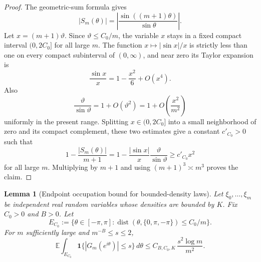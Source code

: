 \documentclass[11pt]{amsart}
\numberwithin{equation}{section}
\newtheorem{lemma}[theorem]{Lemma}
\theoremstyle{definition}
\theoremstyle{remark}
\newcommand{\Exp}{\mathbb E}
\newcommand{\abs}[1]{\left\lvert #1\right\rvert}
\begin{document}
\begin{proof}
The geometric-sum formula gives
\[
  |S_m(\theta)|
  =\left|\frac{\sin((m+1)\theta)}{\sin\theta}\right|.
\]
Let \(x=(m+1)\vartheta\).  Since \(\vartheta\le C_0/m\), the variable \(x\)
stays in a fixed compact interval \((0,2C_0]\) for all large \(m\).  The
function \(x\mapsto |\sin x|/x\) is strictly less than one on every compact
subinterval of \((0,\infty)\), and near zero its Taylor expansion is
\[
  \frac{\sin x}{x}=1-\frac{x^2}{6}+O(x^4).
\]
Also
\[
  \frac{\vartheta}{\sin\vartheta}=1+O(\vartheta^2)
  =1+O\left(\frac{x^2}{m^2}\right)
\]
uniformly in the present range.  Splitting \(x\in(0,2C_0]\) into a small
neighborhood of zero and its compact complement, these two estimates give a
constant \(c'_{C_0}>0\) such that
\[
  1-\frac{|S_m(\theta)|}{m+1}
  =1-\frac{|\sin x|}{x}\frac{\vartheta}{\sin\vartheta}
  \ge c'_{C_0}x^2
\]
for all large \(m\).  Multiplying by \(m+1\) and using
\((m+1)^3\asymp m^3\) proves the claim.
\end{proof}

\begin{lemma}[Endpoint occupation bound for bounded-density laws]\label{lem:endpoint-occ}
Let \(\xi_0,\dots,\xi_m\) be independent real random variables whose densities
are bounded by \(K\).  Fix \(C_0>0\) and \(B>0\).  Let
\[
  E_{C_0}:=\{\theta\in[-\pi,\pi]:\operatorname{dist}(\theta,\{0,\pi,-\pi\})\le C_0/m\}.
\]
For \(m\) sufficiently large and \(m^{-B}\le s\le2\),
\[
  \Exp\int_{E_{C_0}}\mathbf1\{\abs{G_m(e^{i\theta})}\le s\}\,d\theta
  \le C_{B,C_0,K}\,\frac{s^2\log m}{m^2}.
\]
\end{lemma}
\end{document}
